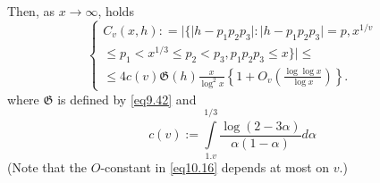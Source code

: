 Then, as $x \to \infty$, holds
\begin{equation*}
\begin{cases}
C_v(x,h): = |\{ |h-p_1 p_2 p_3|: |h-p_1 p_2 p_3| =p, x^{1/v}\\ 
\le
p_1<x^{1/3} \le p_2 < p_3, p_1 p_2 p_3 \le x \} | \le \\ 
\le 4 c(v) \mathfrak{G} (h) \frac{x}{\log^2 x} \left \{ 1+O_v(\frac{\log \log
  x}{\log x}) \right \}. 
\end{cases}\tag{10.16} \label{eq10.16}
\end{equation*}
where $\mathfrak{G}$ is defined by \eqref{eq9.42} and
\begin{equation*}
c(v):= \int\limits^{1/3}_{1.v} \frac{\log (2 - 3 \alpha )}{\alpha
  (1-\alpha )} d \alpha \tag{10.17}\label{eq10.17} 
\end{equation*}
(Note that the $O$-constant in \eqref{eq10.16} depends at most on $v$.)

